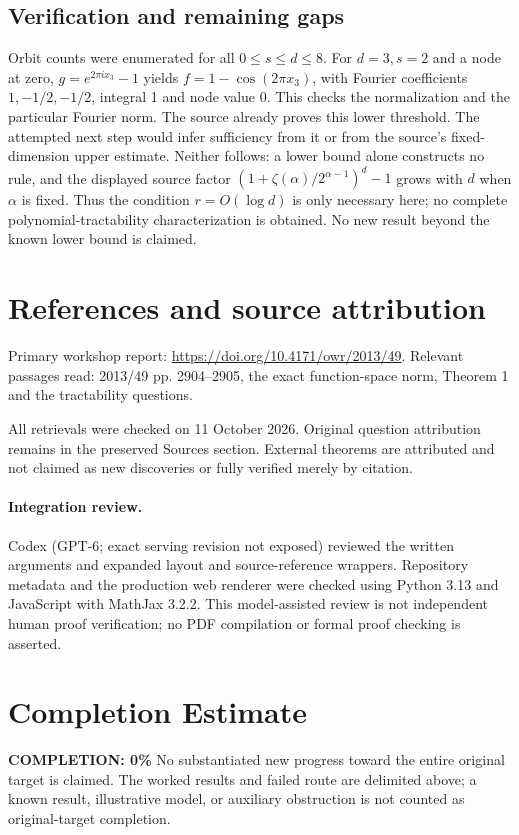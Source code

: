 \documentclass[11pt]{article}
\begin{document}
\subsection{Verification and remaining gaps}
Orbit counts were enumerated for all $0\le s\le d\le8$. For $d=3,s=2$ and a node at zero, $g=e^{2\pi ix_3}-1$ yields $f=1-\cos(2\pi x_3)$, with Fourier coefficients $1,-1/2,-1/2$, integral 1 and node value 0. This checks the normalization and the particular Fourier norm.
The source already proves this lower threshold. The attempted next step would infer sufficiency from it or from the source's fixed-dimension upper estimate. Neither follows: a lower bound alone constructs no rule, and the displayed source factor $(1+\zeta(\alpha)/2^{\alpha-1})^d-1$ grows with $d$ when $\alpha$ is fixed. Thus the condition $r=O(\log d)$ is only necessary here; no complete polynomial-tractability characterization is obtained. No new result beyond the known lower bound is claimed.

\section{References and source attribution}
Primary workshop report: \url{https://doi.org/10.4171/owr/2013/49}. Relevant passages read: 2013/49 pp. 2904--2905, the exact function-space norm, Theorem 1 and the tractability questions.

All retrievals were checked on 11 October 2026. Original question attribution remains in the preserved Sources section. External theorems are attributed and not claimed as new discoveries or fully verified merely by citation.


\paragraph{Integration review.} Codex (GPT-6; exact serving revision not exposed) reviewed the written arguments and expanded layout and source-reference wrappers. Repository metadata and the production web renderer were checked using Python 3.13 and JavaScript with MathJax 3.2.2. This model-assisted review is not independent human proof verification; no PDF compilation or formal proof checking is asserted.

\section{Completion Estimate}
\noindent\textbf{COMPLETION: 0\%}
No substantiated new progress toward the entire original target is claimed. The worked results and failed route are delimited above; a known result, illustrative model, or auxiliary obstruction is not counted as original-target completion.
\end{document}
